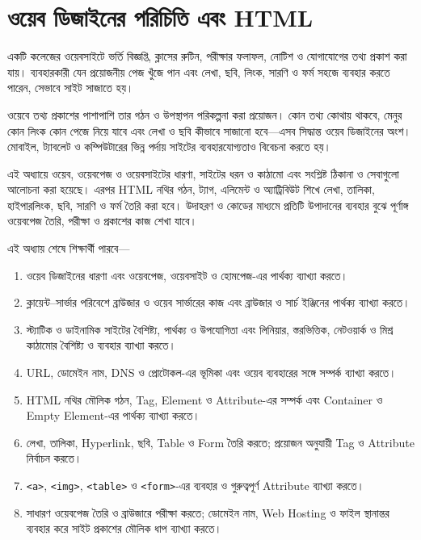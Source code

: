 \ifdefined\chFourStandaloneLayout\else
  
  \chFourGeometry{\newgeometry}
\fi
\begingroup

\setlength{\headwidth}{\textwidth}
\chapter{ওয়েব ডিজাইনের পরিচিতি এবং HTML}

একটি কলেজের ওয়েবসাইটে ভর্তি বিজ্ঞপ্তি, ক্লাসের রুটিন, পরীক্ষার ফলাফল, নোটিশ ও যোগাযোগের তথ্য প্রকাশ করা যায়। ব্যবহারকারী যেন প্রয়োজনীয় পেজ খুঁজে পান এবং লেখা, ছবি, লিংক, সারণি ও ফর্ম সহজে ব্যবহার করতে পারেন, সেভাবে সাইট সাজাতে হয়।

ওয়েবে তথ্য প্রকাশের পাশাপাশি তার গঠন ও উপস্থাপন পরিকল্পনা করা প্রয়োজন। কোন তথ্য কোথায় থাকবে, মেনুর কোন লিংক কোন পেজে নিয়ে যাবে এবং লেখা ও ছবি কীভাবে সাজানো হবে—এসব সিদ্ধান্ত ওয়েব ডিজাইনের অংশ। মোবাইল, ট্যাবলেট ও কম্পিউটারের ভিন্ন পর্দায় সাইটের ব্যবহারযোগ্যতাও বিবেচনা করতে হয়।

এই অধ্যায়ে ওয়েব, ওয়েবপেজ ও ওয়েবসাইটের ধারণা, সাইটের ধরন ও কাঠামো এবং সংশ্লিষ্ট ঠিকানা ও সেবাগুলো আলোচনা করা হয়েছে। এরপর HTML নথির গঠন, ট্যাগ, এলিমেন্ট ও অ্যাট্রিবিউট শিখে লেখা, তালিকা, হাইপারলিংক, ছবি, সারণি ও ফর্ম তৈরি করা হবে। উদাহরণ ও কোডের মাধ্যমে প্রতিটি উপাদানের ব্যবহার বুঝে পূর্ণাঙ্গ ওয়েবপেজ তৈরি, পরীক্ষা ও প্রকাশের কাজ শেখা যাবে।

\begin{learningbox}
এই অধ্যায় শেষে শিক্ষার্থী পারবে—
\begin{enumerate}
\item ওয়েব ডিজাইনের ধারণা এবং ওয়েবপেজ, ওয়েবসাইট ও হোমপেজ-এর পার্থক্য ব্যাখ্যা করতে।
\item ক্লায়েন্ট–সার্ভার পরিবেশে ব্রাউজার ও ওয়েব সার্ভারের কাজ এবং ব্রাউজার ও সার্চ ইঞ্জিনের পার্থক্য ব্যাখ্যা করতে।
\item স্ট্যাটিক ও ডাইনামিক সাইটের বৈশিষ্ট্য, পার্থক্য ও উপযোগিতা এবং লিনিয়ার, স্তরভিত্তিক, নেটওয়ার্ক ও মিশ্র কাঠামোর বৈশিষ্ট্য ও ব্যবহার ব্যাখ্যা করতে।
\item URL, ডোমেইন নাম, DNS ও প্রোটোকল-এর ভূমিকা এবং ওয়েব ব্যবহারের সঙ্গে সম্পর্ক ব্যাখ্যা করতে।
\item HTML নথির মৌলিক গঠন, Tag, Element ও Attribute-এর সম্পর্ক এবং Container ও Empty Element-এর পার্থক্য ব্যাখ্যা করতে।
\item লেখা, তালিকা, Hyperlink, ছবি, Table ও Form তৈরি করতে; প্রয়োজন অনুযায়ী Tag ও Attribute নির্বাচন করতে।
\item \texttt{<a>}, \texttt{<img>}, \texttt{<table>} ও \texttt{<form>}-এর ব্যবহার ও গুরুত্বপূর্ণ Attribute ব্যাখ্যা করতে।
\item সাধারণ ওয়েবপেজ তৈরি ও ব্রাউজারে পরীক্ষা করতে; ডোমেইন নাম, Web Hosting ও ফাইল স্থানান্তর ব্যবহার করে সাইট প্রকাশের মৌলিক ধাপ ব্যাখ্যা করতে।
\end{enumerate}
\end{learningbox}

